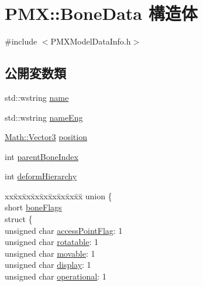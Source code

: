 \hypertarget{struct_p_m_x_1_1_bone_data}{}\section{P\+MX\+:\+:Bone\+Data 構造体}
\label{struct_p_m_x_1_1_bone_data}


{\ttfamily \#include $<$P\+M\+X\+Model\+Data\+Info.\+h$>$}

\subsection*{公開変数類}
\begin{DoxyCompactItemize}
\item 
std\+::wstring \mbox{\hyperlink{struct_p_m_x_1_1_bone_data_ac9b306bf896f65f8b5b4ff406cefb36a}{name}}
\item 
std\+::wstring \mbox{\hyperlink{struct_p_m_x_1_1_bone_data_a3cee0d841e897681e289e2b1296ad6a9}{name\+Eng}}
\item 
\mbox{\hyperlink{struct_math_1_1_vector3}{Math\+::\+Vector3}} \mbox{\hyperlink{struct_p_m_x_1_1_bone_data_a91c78c4e24df41ec33647615f418c642}{position}}
\item 
int \mbox{\hyperlink{struct_p_m_x_1_1_bone_data_a6e579865a44525fd2895fcd27b43713a}{parent\+Bone\+Index}}
\item 
int \mbox{\hyperlink{struct_p_m_x_1_1_bone_data_a8c68883126da8c494401bf534a5b0fbf}{deform\+Hierarchy}}
\item 
\begin{tabbing}
xx\=xx\=xx\=xx\=xx\=xx\=xx\=xx\=xx\=\kill
union \{\\
\>short \mbox{\hyperlink{struct_p_m_x_1_1_bone_data_afad4f170afccdb54d16e076ecb7bd6fa}{boneFlags}}\\
\>struct \{\\
\>\>unsigned char \mbox{\hyperlink{struct_p_m_x_1_1_bone_data_a42564b5cad5e256b626c57eb48675e0f}{accessPointFlag}}: 1\\
\>\>unsigned char \mbox{\hyperlink{struct_p_m_x_1_1_bone_data_a3cfa69d4ac03c7476ae4559161df0d8f}{rotatable}}: 1\\
\>\>unsigned char \mbox{\hyperlink{struct_p_m_x_1_1_bone_data_a1d6b4c0726c86e1ebc0099fb28b64328}{movable}}: 1\\
\>\>unsigned char \mbox{\hyperlink{struct_p_m_x_1_1_bone_data_a1293bb734c9e2e08f982fb9b274ec9f3}{display}}: 1\\
\>\>unsigned char \mbox{\hyperlink{struct_p_m_x_1_1_bone_data_a378a67ef1ec7e17b08dac9ec97d44806}{operational}}: 1\\

\end{tabbing}
\end{DoxyCompactItemize}
